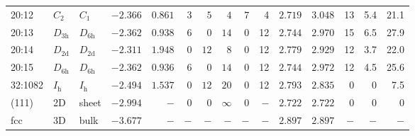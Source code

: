 \begin{table}[htbp]
{\begin{tabular}{lllrrrrrrrrrrrr}
20:12   & $C_\mathrm{2}$  & $C_\mathrm{1}$    & $-2.366$ & $0.861$  & $3$ & $5$  & $4$      & $7$ & 4   & $2.719$ & $3.048$ & 13  & 5.4  & 21.1  \\
20:13   & $D_\mathrm{3h}$ & $D_\mathrm{6h}$ & $-2.362$ & $0.938$  & $6$ & $0$  & $14$     & $0$ & 12  & $2.744$ & $2.970$ & 15  & 6.5  & 27.9  \\
20:14   & $D_\mathrm{2d}$ & $D_\mathrm{2d}$ & $-2.311$ & $1.948$  & $0$ & $12$ & $8$      & $0$ & 12  & $2.779$ & $2.929$ & 12  & 3.7  & 22.0  \\
20:15   & $D_\mathrm{6h}$ & $D_\mathrm{6h}$ & $-2.362$ & $0.936$  & $6$ & $0$  & $14$     & $0$ & 12  & $2.744$ & $2.972$ & 12  & 4.5  & 25.6  \\
32:1082 & $I_\mathrm{h}$  & $I_\mathrm{h}$    & $-2.494$ & $1.537$  & $0$ & $12$ & $20$     & $0$ & 12  & $2.793$ & $2.835$ & 0   & 0    & 7.5   \\
(111)   & 2D              & sheet    & $-2.994$ & $-$      & $0$ & $0$  & $\infty$ & $0$ & $-$ & $2.722$ & $2.722$ & 0   & 0    & 0     \\
fcc     & 3D              & bulk     & $-3.677$ & $-$      & $-$ & $-$  & $-$      & $-$ & $-$ & $2.897$ & $2.897$ & $-$ & $-$  & $-$   \\
		\bottomrule
    \end{tabular}}
\end{table}
%
%
